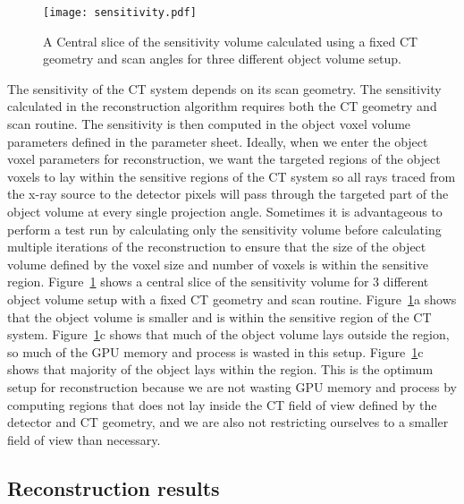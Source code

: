 \begin{figure}
\centering
\texttt{[image: sensitivity.pdf]}
\caption{A Central slice of the sensitivity volume calculated using a fixed CT geometry and scan angles for three different object volume setup.}
\label{fig:sensitivityslices}
\end{figure}

The sensitivity of the CT system depends on its scan geometry.  The sensitivity calculated in the reconstruction algorithm requires both the CT geometry and scan routine.  The sensitivity is then computed in the object voxel volume parameters defined in the parameter sheet.  Ideally, when we enter the object voxel parameters for reconstruction, we want the targeted regions of the object voxels to lay within the sensitive regions of the CT system so all rays traced from the x-ray source to the detector pixels will pass through the targeted part of the object volume at every single projection angle.  Sometimes it is advantageous to perform a test run by calculating only the sensitivity volume before calculating multiple iterations of the reconstruction to ensure that the size of the object volume defined by the voxel size and number of voxels is within the sensitive region.  Figure~\ref{fig:sensitivityslices} shows a central slice of the sensitivity volume for 3 different object volume setup with a fixed CT geometry and scan routine.  Figure~\ref{fig:sensitivityslices}a shows that the object volume is smaller and is within the sensitive region of the CT system.  Figure~\ref{fig:sensitivityslices}c shows that much of the object volume lays outside the region, so much of the GPU memory and process is wasted in this setup. Figure~\ref{fig:sensitivityslices}c shows that majority of the object lays within the region.  This is the optimum setup for reconstruction because we are not wasting GPU memory and process by computing regions that does not lay inside the CT field of view defined by the detector and CT geometry, and we are also not restricting ourselves to a smaller field of view than necessary.

\subsection{Reconstruction results}

